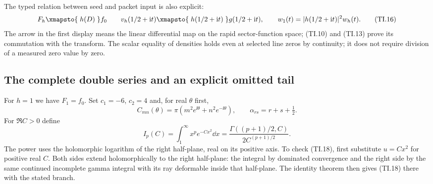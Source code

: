 The typed relation between seed and packet input is also explicit:
\begin{equation}
 F_h\xmapsto{\;h(D)\;}f_0
 \qquad
 v_h(1/2+\ii t)\xmapsto{\;h(1/2+\ii t)\;}
 g(1/2+\ii t),\qquad
 w_1(t)=|h(1/2+\ii t)|^2w_h(t). \tag{TI.16}
\end{equation}
The arrow in the first display means the linear differential map on
the rapid sector-function space; (TI.10) and (TI.13) prove its
commutation with the transform. The scalar equality of densities
holds even at selected line zeros by continuity; it does not require
division of a measured zero value by zero.

\subsection{The complete double series and an explicit omitted tail}

For $h=1$ we have $F_1=f_0$. Set $c_1=-6$, $c_2=4$ and, for real
$\theta$ first,
\begin{equation}
 C_{mn}(\theta)=\pi(m^2e^{\ii\theta}+n^2e^{-\ii\theta}),\qquad
 \alpha_{rs}=r+s+\tfrac12. \tag{TI.17}
\end{equation}
For $\Re C>0$ define
\begin{equation}
 I_p(C)=\int_1^\infty x^p e^{-Cx^2}\dd x
 =\frac{\Gamma((p+1)/2,C)}{2C^{(p+1)/2}}. \tag{TI.18}
\end{equation}
The power uses the holomorphic logarithm of the right half-plane,
real on its positive axis. To check (TI.18), first substitute $u=Cx^2$
for positive real $C$. Both sides extend holomorphically to the right
half-plane: the integral by dominated convergence and the right side
by the same continued incomplete gamma integral with its ray deformable
inside that half-plane. The identity theorem then gives (TI.18)
there with the stated branch.

